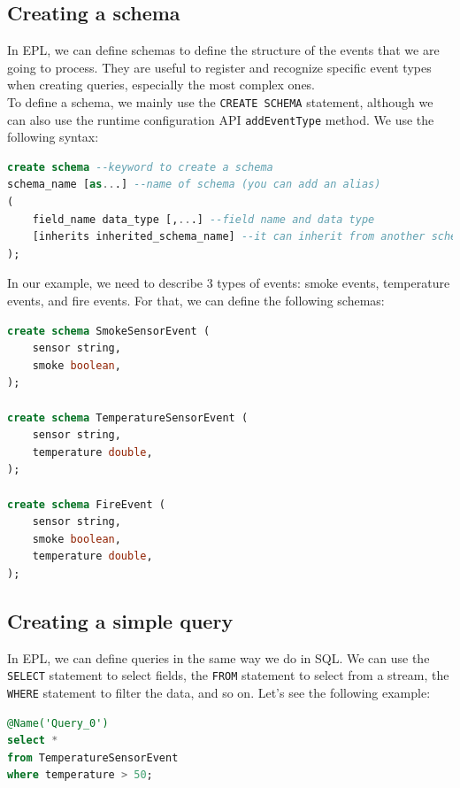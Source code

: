 \subsection{Creating a schema}

In EPL, we can define schemas to define the structure of the events that we are
going to process. They are useful to register and recognize specific event types
when creating queries, especially the most complex ones.\\

To define a schema, we mainly use the \texttt{CREATE SCHEMA} statement, although
we can also use the runtime configuration API \texttt{addEventType} method.
We use the following syntax:\\

\begin{lstlisting}[language=SQL]
create schema --keyword to create a schema
schema_name [as...] --name of schema (you can add an alias)
(
    field_name data_type [,...] --field name and data type
    [inherits inherited_schema_name] --it can inherit from another schema
);
\end{lstlisting}

In our example, we need to describe 3 types of events: smoke events, temperature
events, and fire events. For that, we can define the following schemas:\\

\begin{lstlisting}[language=SQL]
create schema SmokeSensorEvent (
    sensor string,
    smoke boolean,
);

create schema TemperatureSensorEvent (
    sensor string,
    temperature double,
);

create schema FireEvent (
    sensor string,
    smoke boolean,
    temperature double,
);
\end{lstlisting}

\subsection{Creating a simple query}

In EPL, we can define queries in the same way we do in SQL. We can use the
\texttt{SELECT} statement to select fields, the \texttt{FROM} statement to select
from a stream, the \texttt{WHERE} statement to filter the data, and so on. Let's
see the following example:\\

\begin{lstlisting}[language=SQL]
@Name('Query_0')
select *
from TemperatureSensorEvent
where temperature > 50;
\end{lstlisting}

